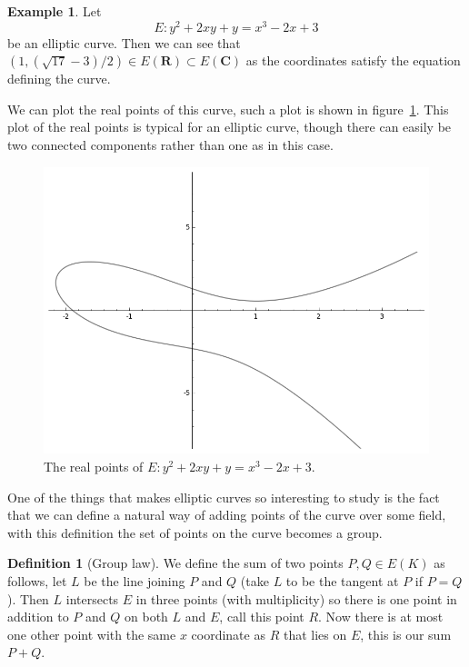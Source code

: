 \documentclass[12pt,a4paper,abstracton,bibtotoc]{scrreprt}
\theoremstyle{definition}
\newtheorem{defn}{Definition}
\newtheorem{ex}{Example}
\newcommand{\RR}{\mathbf{R}}
\newcommand{\CC}{\mathbf{C}}
\begin{document}
\begin{ex}
Let 
\[
E \colon y^2 + 2xy + y = x^3 - 2x + 3
\]
be an elliptic curve.
Then we can see that $(1,(\sqrt{17}-3)/2)\in E(\RR) \subset E(\CC)$ as the coordinates satisfy the equation defining the curve.

We can plot the real points of this curve, such a plot is shown in figure~\ref{fig:ec}.
This plot of the real points is typical for an elliptic curve, though there can easily be two connected components rather than one as in this case.
\begin{figure}
\centering
\includegraphics[scale=0.6]{sageec}
\caption{\label{fig:ec}The real points of $E \colon y^2 + 2xy + y = x^3 - 2x + 3$.}
\end{figure}
\end{ex}

One of the things that makes elliptic curves so interesting to study is the fact that we can define a natural way of adding points of the curve over some field, with this definition the set of points on the curve becomes a group.

\begin{defn}[Group law] %
We define the sum of two points $P,Q\in E(K)$ as follows, let $L$ be the line joining $P$ and $Q$ (take $L$ to be the tangent at $P$ if $P=Q$).
Then $L$ intersects $E$ in three points (with multiplicity) so there is one point in addition to $P$ and $Q$ on both $L$ and $E$, call this point $R$.
Now there is at most one other point with the same $x$ coordinate as $R$ that lies on $E$, this is our sum $P+Q$.
\end{defn}
\end{document}
